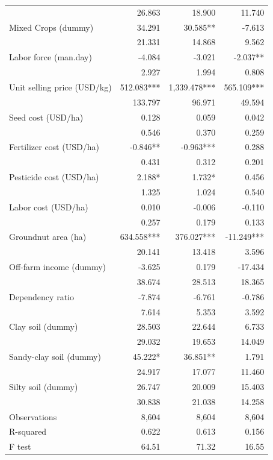 \documentclass[
]{article}
\begin{document}
\begin{longtable}[t]{lrrr}
 & 26.863 & 18.900 & 11.740\\
Mixed Crops (dummy) & 34.291 & 30.585** & -7.613\\
 & 21.331 & 14.868 & 9.562\\
Labor force (man.day) & -4.084 & -3.021 & -2.037**\\
 & 2.927 & 1.994 & 0.808\\
Unit selling price (USD/kg) & 512.083*** & 1,339.478*** & 565.109***\\
 & 133.797 & 96.971 & 49.594\\
Seed cost (USD/ha) & 0.128 & 0.059 & 0.042\\
 & 0.546 & 0.370 & 0.259\\
Fertilizer cost (USD/ha) & -0.846** & -0.963*** & 0.288\\
 & 0.431 & 0.312 & 0.201\\
Pesticide cost (USD/ha) & 2.188* & 1.732* & 0.456\\
 & 1.325 & 1.024 & 0.540\\
Labor cost (USD/ha) & 0.010 & -0.006 & -0.110\\
 & 0.257 & 0.179 & 0.133\\
Groundnut area (ha) & 634.558*** & 376.027*** & -11.249***\\
 & 20.141 & 13.418 & 3.596\\
Off-farm income (dummy) & -3.625 & 0.179 & -17.434\\
 & 38.674 & 28.513 & 18.365\\
Dependency ratio & -7.874 & -6.761 & -0.786\\
 & 7.614 & 5.353 & 3.592\\
Clay soil (dummy) & 28.503 & 22.644 & 6.733\\
 & 29.032 & 19.653 & 14.049\\
Sandy-clay soil (dummy) & 45.222* & 36.851** & 1.791\\
 & 24.917 & 17.077 & 11.460\\
Silty soil (dummy) & 26.747 & 20.009 & 15.403\\
 & 30.838 & 21.038 & 14.258\\
Observations & 8,604 & 8,604 & 8,604\\
R-squared & 0.622 & 0.613 & 0.156\\
F test & 64.51 & 71.32 & 16.55\\*
\end{longtable}
\endgroup{}
\newpage

\begingroup\fontsize{7}{9}\selectfont
\end{document}
